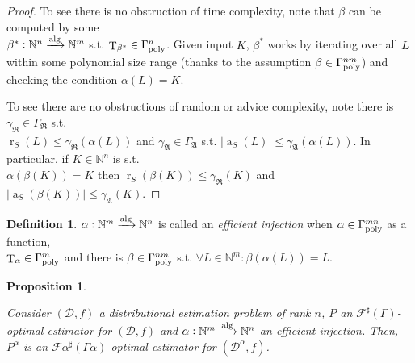 \documentclass[11pt]{article}
\numberwithin{equation}{section}
\theoremstyle{definition}
\newtheorem{definition}{Definition}[section]
\theoremstyle{plain}
\newtheorem{proposition}{Proposition}[section]
\DeclareMathOperator{\T}{T}
\DeclareMathOperator{\R}{r}
\DeclareMathOperator{\A}{a}
\newcommand{\Nats}{\mathbb{N}}
\newcommand{\Abs}[1]{\lvert #1 \rvert}
\newcommand{\Dist}{\mathcal{D}}
\newcommand{\GrowR}{\Gamma_{\mathfrak{R}}}
\newcommand{\GrowA}{\Gamma_{\mathfrak{A}}}
\newcommand{\Fall}{\mathcal{F}}
\newcommand{\ESG}{\Fall^\sharp(\Gamma)}
\newcommand{\GammaPoly}{\Gamma_{\textnormal{poly}}}
\newcommand{\Alg}{\xrightarrow{\textnormal{alg}}}
\begin{document}
\begin{proof}

To see there is no obstruction of time complexity, note that ${\beta}$ can be computed by some\\ ${\beta^*: \Nats^n \Alg \Nats^m}$ s.t. ${\T_{\beta^*} \in \GammaPoly^n}$. Given input ${K}$, ${\beta^*}$ works by iterating over all ${L}$ within some polynomial size range (thanks to the assumption ${\beta \in \GammaPoly^{nm}}$) and checking the condition ${\alpha(L)=K}$.

To see there are no obstructions of random or advice complexity, note there is ${\gamma_{\mathfrak{R}} \in \GrowR}$ s.t.\\ $\R_S(L) \leq \gamma_{\mathfrak{R}}(\alpha(L))$ and ${\gamma_{\mathfrak{A}} \in \GrowA}$ s.t. ${\Abs{\A_S(L)} \leq \gamma_{\mathfrak{A}}(\alpha(L))}$. In particular, if ${K \in \Nats^n}$ is s.t.\\ $\alpha(\beta(K))=K$ then ${\R_S(\beta(K)) \leq \gamma_{\mathfrak{R}}(K)}$ and ${\Abs{\A_S(\beta(K))} \leq \gamma_{\mathfrak{A}}(K)}$.
%
\end{proof}

\begin{samepage}
\begin{definition}

${\alpha: \Nats^m \Alg \Nats^n}$ is called an \emph{efficient injection} when ${\alpha \in \GammaPoly^{mn}}$ as a function,\\ $\T_\alpha \in \GammaPoly^m$ and there is ${\beta \in \GammaPoly^{nm}}$ s.t. ${\forall L \in \Nats^m: \beta(\alpha(L))=L}$.

\end{definition}
\end{samepage}

\begin{samepage}
\begin{proposition}
\label{prp:idx_reduce_sharp}

Consider $(\Dist,f)$ a distributional estimation problem of rank ${n}$, ${P}$ an ${\ESG}$-optimal estimator for ${(\Dist,f)}$ and ${\alpha: \Nats^m \Alg \Nats^n}$ an efficient injection. Then, ${P^\alpha}$ is an ${\Fall \alpha^\sharp(\Gamma \alpha)}$-optimal estimator for ${(\Dist^\alpha,f)}$.

\end{proposition}
\end{samepage}
\end{document}
